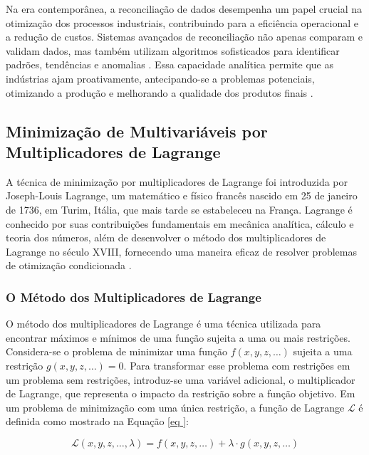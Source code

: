 Na era contemporânea, a reconciliação de dados desempenha um papel crucial na otimização dos processos industriais, contribuindo para a eficiência operacional e a redução de custos. Sistemas avançados de reconciliação não apenas comparam e validam dados, mas também utilizam algoritmos sofisticados para identificar padrões, tendências e anomalias \cite{datarecragnoli}. Essa capacidade analítica permite que as indústrias ajam proativamente, antecipando-se a problemas potenciais, otimizando a produção e melhorando a qualidade dos produtos finais \cite{datarecshakar}.

\subsection{Minimização de Multivariáveis por Multiplicadores de Lagrange}

A técnica de minimização por multiplicadores de Lagrange foi introduzida por Joseph-Louis Lagrange, um matemático e físico francês nascido em 25 de janeiro de 1736, em Turim, Itália, que mais tarde se estabeleceu na França. Lagrange é conhecido por suas contribuições fundamentais em mecânica analítica, cálculo e teoria dos números, além de desenvolver o método dos multiplicadores de Lagrange no século XVIII, fornecendo uma maneira eficaz de resolver problemas de otimização condicionada \cite{lagrange}.

\subsubsection{O Método dos Multiplicadores de Lagrange}

O método dos multiplicadores de Lagrange é uma técnica utilizada para encontrar máximos e mínimos de uma função sujeita a uma ou mais restrições. Considera-se o problema de minimizar uma função $f(x, y, z, \dots)$ sujeita a uma restrição $g(x, y, z, \dots) = 0$. Para transformar esse problema com restrições em um problema sem restrições, introduz-se uma variável adicional, o multiplicador de Lagrange, que representa o impacto da restrição sobre a função objetivo. Em um problema de minimização com uma única restrição, a função de Lagrange $\mathcal{L}$ é definida como mostrado na Equação \ref{eq
}:

\begin{equation} \mathcal{L}(x, y, z, \dots, \lambda) = f(x, y, z, \dots) + \lambda \cdot g(x, y, z, \dots) \label{eq
} \end{equation}

